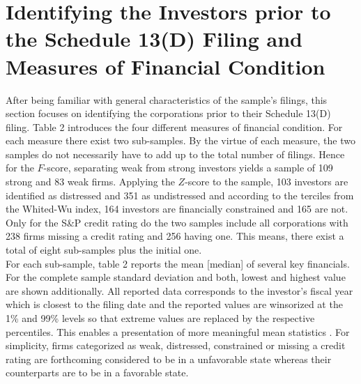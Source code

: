 \documentclass[12pt]{article}
\begin{document}
\section{Identifying the Investors prior to the Schedule 13(D) Filing and Measures of Financial Condition}

After being familiar with general characteristics of the sample's filings, this section focuses on identifying the corporations prior to their Schedule 13(D) filing.
Table 2 introduces the four different measures of financial condition. For each measure there exist two sub-samples. By the virtue of each measure, the two samples do not necessarily have to add up to the total number of filings. Hence for the $F$-score, separating weak from strong investors yields a sample of 109 strong and 83 weak firms. Applying the $Z$-score to the sample, 103 investors are identified as distressed and 351 as undistressed and according to the terciles from the Whited-Wu index, 164 investors are financially constrained and 165 are not. Only for the S\&P credit rating do the two samples include all corporations with 238 firms missing a credit rating and 256 having one. This means, there exist a total of eight sub-samples plus the initial one.\\
For each sub-sample, table 2 reports the mean [median] of several key financials. For the complete sample standard deviation and both, lowest and highest value are shown additionally. All reported data corresponds to the investor's fiscal year which is closest to the filing date and the reported values are winsorized at the 1\% and 99\% levels so that extreme values are replaced by the respective percentiles. This enables a presentation of more meaningful mean statistics \citep[p.203]{Klein2009}. For simplicity, firms categorized as weak, distressed, constrained or missing a credit rating are forthcoming considered to be in a unfavorable state whereas their counterparts are to be in a favorable state. %
\end{document}
